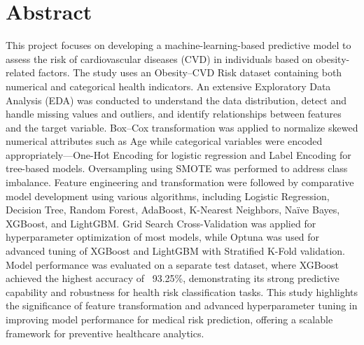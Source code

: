 \chapter{Abstract}\label{ch:abstract}


This project focuses on developing a machine-learning-based predictive model to assess the risk of cardiovascular diseases (CVD) in individuals based on obesity-related factors.
The study uses an Obesity–CVD Risk dataset containing both numerical and categorical health indicators.
An extensive Exploratory Data Analysis (EDA) was conducted to understand the data distribution, detect and handle missing values and outliers, and identify relationships between features and the target variable.
Box–Cox transformation was applied to normalize skewed numerical attributes such as Age while categorical variables were encoded appropriately—One-Hot Encoding for logistic regression and Label Encoding for tree-based models.
Oversampling using SMOTE was performed to address class imbalance.
Feature engineering and transformation were followed by comparative model development using various algorithms, including Logistic Regression, Decision Tree, Random Forest, AdaBoost, K-Nearest Neighbors, Naïve Bayes, XGBoost, and LightGBM. Grid Search Cross-Validation was applied for hyperparameter optimization of most models, while Optuna was used for advanced tuning of XGBoost and LightGBM with Stratified K-Fold validation.
Model performance was evaluated on a separate test dataset, where XGBoost achieved the highest accuracy of ~93.25\%, demonstrating its strong predictive capability and robustness for health risk classification tasks.
This study highlights the significance of feature transformation and advanced hyperparameter tuning in improving model performance for medical risk prediction, offering a scalable framework for preventive healthcare analytics.
